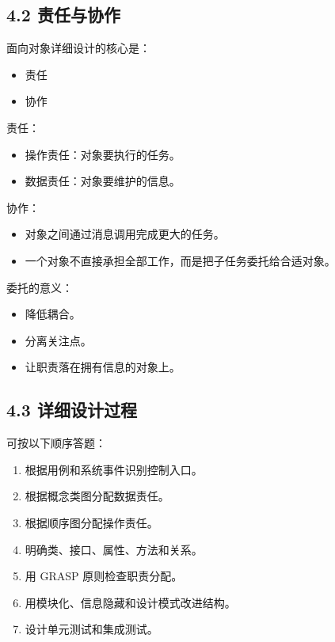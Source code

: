 \documentclass[UTF8,zihao=-4]{ctexart}
\begin{document}
\subsection{4.2 责任与协作}

面向对象详细设计的核心是：

\begin{itemize}
\item 责任
\item 协作
\end{itemize}

责任：

\begin{itemize}
\item 操作责任：对象要执行的任务。
\item 数据责任：对象要维护的信息。
\end{itemize}

协作：

\begin{itemize}
\item 对象之间通过消息调用完成更大的任务。
\item 一个对象不直接承担全部工作，而是把子任务委托给合适对象。
\end{itemize}

委托的意义：

\begin{itemize}
\item 降低耦合。
\item 分离关注点。
\item 让职责落在拥有信息的对象上。
\end{itemize}

\subsection{4.3 详细设计过程}

可按以下顺序答题：

\begin{enumerate}
\item 根据用例和系统事件识别控制入口。
\item 根据概念类图分配数据责任。
\item 根据顺序图分配操作责任。
\item 明确类、接口、属性、方法和关系。
\item 用 GRASP 原则检查职责分配。
\item 用模块化、信息隐藏和设计模式改进结构。
\item 设计单元测试和集成测试。
\end{enumerate}
\end{document}
